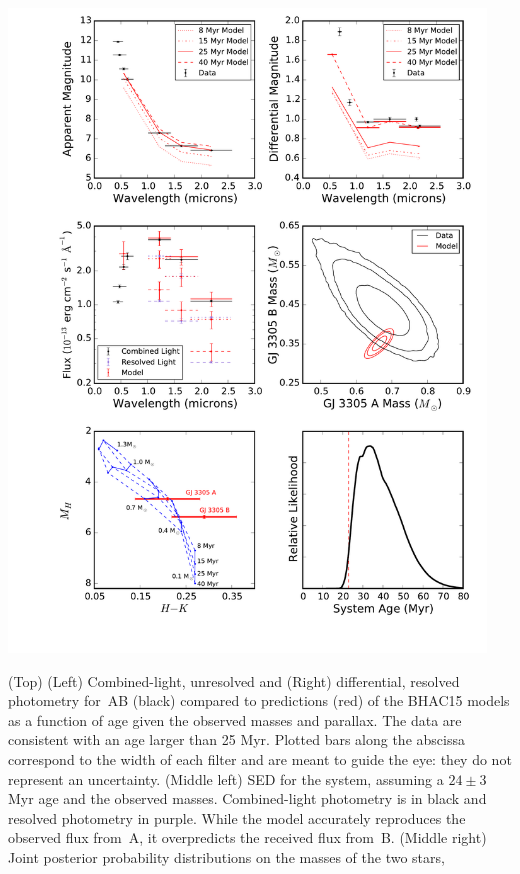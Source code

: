 \begin{FPfigure}
\centerline{\includegraphics[width=0.95\textwidth]{chapter6/f2.pdf}}
\caption[Joint posterior probability distributions on the masses of \thisstarsix\,A and B, and comparison to the predictions
of theoretical models in color, luminosity, mass, and age]{(Top) (Left) Combined-light, unresolved and (Right) differential, resolved photometry for \thisstarsix\,AB (black) compared to
predictions (red) of the BHAC15 models as a function of age given the observed masses and parallax. The data are consistent with an age larger than 25 Myr.
Plotted bars along the abscissa correspond to the width of each filter and are meant to guide the eye: 
they do not represent an uncertainty.
(Middle left) SED for the system, assuming a $24 \pm 3$ Myr age and the observed masses. 
Combined-light photometry is in black and resolved photometry in purple. 
While the
model accurately reproduces the observed flux from \thisstarsix\,A, it overpredicts the received flux from 
\thisstarsix\,B.
(Middle right) Joint posterior probability distributions on the masses of the two stars,
}
\end{FPfigure}
